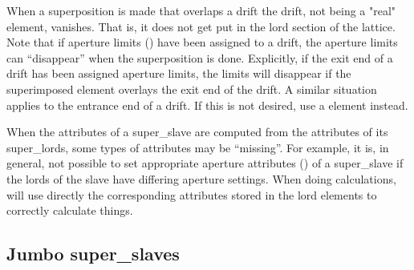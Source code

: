 When a superposition is made that overlaps a drift the drift, not
being a "real" element, vanishes. That is, it does not get put in the
lord section of the lattice.  Note that if aperture limits
() have been assigned to a drift, the aperture limits
can ``disappear'' when the superposition is done. Explicitly, if the
exit end of a drift has been assigned aperture limits, the limits will
disappear if the superimposed element overlays the exit end of the
drift. A similar situation applies to the entrance end of a drift. If
this is not desired, use a  element instead.

When the attributes of a super_slave are computed from the attributes
of its super_lords, some types of attributes may be ``missing''. For
example, it is, in general, not possible to set appropriate aperture
attributes () of a super_slave if the lords of the slave
have differing aperture settings. When doing calculations, \bmad will
use directly the corresponding attributes stored in the lord elements to
correctly calculate things.

\subsection{Jumbo super_slaves}
\label{s:jumbo.slave}

